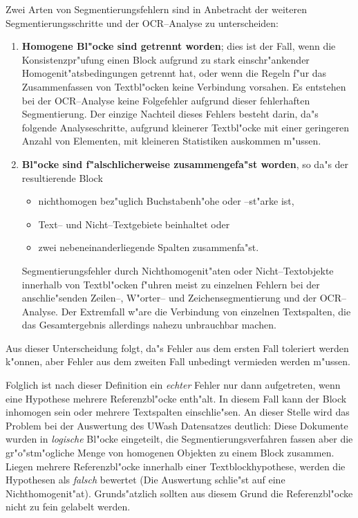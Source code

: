 Zwei Arten von Segmentierungsfehlern sind in Anbetracht der weiteren 
Segmentierungsschritte und der OCR--Analyse zu unterscheiden:
\begin{enumerate}
  \item {\bf Homogene Bl"ocke sind getrennt worden}; dies ist der Fall, wenn die Konsistenzpr"ufung
  einen Block aufgrund zu stark einschr"ankender Homogenit"atsbedingungen getrennt hat, oder wenn
  die Regeln f"ur das Zusammenfassen von Textbl"ocken keine Verbindung vorsahen. 
  Es entstehen bei der OCR--Analyse keine Folgefehler aufgrund dieser fehlerhaften 
  Segmentierung. Der einzige Nachteil dieses Fehlers besteht darin, da"s folgende Analyseschritte,
  aufgrund kleinerer Textbl"ocke mit einer geringeren Anzahl von Elementen,
  mit kleineren Statistiken auskommen m"ussen.
  
  \item {\bf Bl"ocke sind f"alschlicherweise zusammengefa"st worden}, so da"s
  der resultierende Block
    \begin{itemize}
      \item nichthomogen bez"uglich Buchstabenh"ohe oder --st"arke ist,
      \item Text-- und Nicht--Textgebiete beinhaltet oder
      \item zwei nebeneinanderliegende Spalten zusammenfa"st.
    \end{itemize}
  Segmentierungsfehler durch Nichthomogenit"aten oder Nicht--Textobjekte innerhalb von
  Textbl"ocken f"uhren meist zu einzelnen Fehlern bei der anschlie"senden Zeilen--, W"orter-- und
  Zeichensegmentierung und der OCR--Analyse. Der Extremfall w"are die Verbindung von einzelnen
  Textspalten, die das Gesamtergebnis allerdings nahezu unbrauchbar machen.
\end{enumerate}

Aus dieser Unterscheidung folgt, da"s Fehler aus dem ersten Fall toleriert werden k"onnen,
aber Fehler aus dem zweiten Fall unbedingt vermieden werden m"ussen.

Folglich ist nach dieser Definition ein {\em echter\/} Fehler nur dann aufgetreten, wenn eine
Hypothese mehrere Referenzbl"ocke enth"alt. In diesem Fall kann der Block inhomogen sein
oder mehrere Textspalten einschlie"sen. 
An dieser Stelle wird das Problem bei der Auswertung des UWash Datensatzes deutlich:
Diese Dokumente wurden in {\em logische\/} Bl"ocke eingeteilt, die Segmentierungsverfahren 
fassen aber die gr"o"stm"ogliche Menge von homogenen Objekten zu einem Block zusammen. Liegen
mehrere Referenzbl"ocke innerhalb einer Textblockhypothese, werden die Hypothesen
als {\em falsch\/} bewertet (Die Auswertung schlie"st auf eine Nichthomogenit"at). 
Grunds"atzlich sollten aus diesem Grund die Referenzbl"ocke nicht zu fein gelabelt werden.

